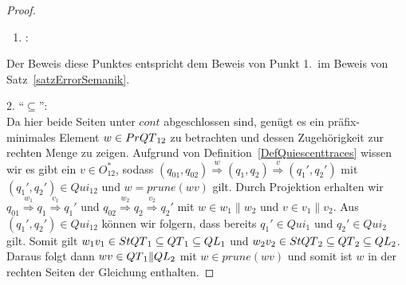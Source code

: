 \begin{proof}
  ~
  \begin{enumerate}
    \item \hspace{-0.2cm}:
  \end{enumerate}
  \vspace{-0.3cm}
  Der Beweis diese Punktes entspricht dem Beweis von Punkt 1.\ im Beweis von
  Satz~\ref{satzErrorSemanik}.

  2. ``$\subseteq$'':\\
  Da hier beide Seiten unter $cont$ abgeschlossen sind, genügt es ein
  präfix-minimales Element $w\in PrQT{}_{12}$ zu betrachten und dessen
  Zugehörigkeit zur rechten Menge zu zeigen. Aufgrund von
  Definition~\ref{DefQuiescenttraces} wissen wir es gibt ein $v\in O_{12}^*$,
  sodass $(q_{01},q_{02}) \overset{w}{\Rightarrow} (q_1,q_2)
  \overset{v}{\Rightarrow} (q_1',q_2')$ mit $(q_1',q_2')\in Qui_{12}$ und
  $w=prune(wv)$ gilt. Durch Projektion erhalten wir $q_{01}
  \overset{w_1}{\Rightarrow} q_1 \overset{v_1}{\Rightarrow} q_1'$ und $q_{02}
  \overset{w_2}{\Rightarrow} q_2 \overset{v_2}{\Rightarrow} q_2'$ mit $w\in
  w_1\|w_2$ und $v\in v_1\|v_2$. Aus $(q_1',q_2')\in Qui_{12}$ können wir
  folgern, dass bereits $q_1'\in Qui_1$ und $q_2'\in Qui_2$ gilt. Somit gilt
  $w_1v_1\in StQT{}_1\subseteq QT{}_1\subseteq QL{}_1$ und $w_2v_2\in StQT{}_2\subseteq
  QT{}_2\subseteq QL{}_2$. Daraus folgt dann $wv\in QT{}_1\|QL{}_2$ mit $w\in
  prune(wv)$ und somit ist $w$ in der rechten Seiten der Gleichung enthalten.


\end{proof}
